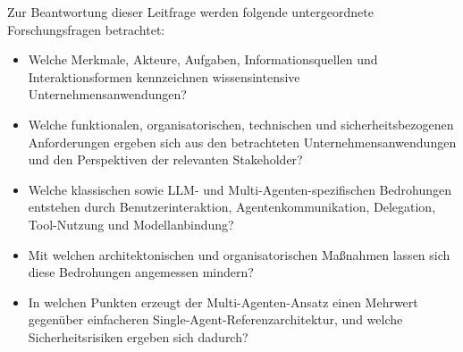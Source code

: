 Zur Beantwortung dieser Leitfrage werden folgende untergeordnete Forschungsfragen betrachtet:

\begin{itemize}
	\item Welche Merkmale, Akteure, Aufgaben, Informationsquellen und Interaktionsformen kennzeichnen wissensintensive Unternehmensanwendungen?
	\item Welche funktionalen, organisatorischen, technischen und sicherheitsbezogenen Anforderungen ergeben sich aus den betrachteten Unternehmensanwendungen und den Perspektiven der relevanten Stakeholder?
	\item Welche klassischen sowie LLM- und Multi-Agenten-spezifischen Bedrohungen entstehen durch Benutzerinteraktion, Agentenkommunikation, Delegation, Tool-Nutzung und Modellanbindung?
	\item Mit welchen architektonischen und organisatorischen Maßnahmen lassen sich diese Bedrohungen angemessen mindern?
	\item In welchen Punkten erzeugt der Multi-Agenten-Ansatz einen Mehrwert gegenüber einfacheren Single-Agent-Referenzarchitektur, und welche Sicherheitsrisiken ergeben sich dadurch?
\end{itemize}

\newpage